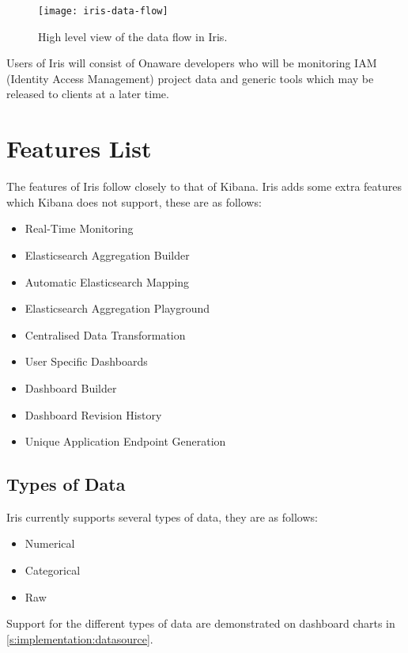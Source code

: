 \documentclass[12pt,a4paper,titlepage]{report}
\begin{document}
\begin{figure}[H]
\begin{tcolorbox}
\begin{center}
\texttt{[image: iris-data-flow]}
\end{center}
\end{tcolorbox}
\caption{High level view of the data flow in Iris.}
\end{figure}

Users of Iris will consist of Onaware developers who will be monitoring IAM (Identity Access Management) project data and generic tools which may be released to clients at a later time.

\section{Features List}
The features of Iris follow closely to that of Kibana. Iris adds some extra features which Kibana does not support, these are as follows:
\begin{itemize}
    \item Real-Time Monitoring
    \item Elasticsearch Aggregation Builder
    \item Automatic Elasticsearch Mapping
    \item Elasticsearch Aggregation Playground
    \item Centralised Data Transformation
    \item User Specific Dashboards
    \item Dashboard Builder
    \item Dashboard Revision History
    \item Unique Application Endpoint Generation
\end{itemize}
\subsection{Types of Data}
Iris currently supports several types of data, they are as follows:
\begin{itemize}
    \item Numerical
    \item Categorical
    \item Raw
\end{itemize}

Support for the different types of data are demonstrated on dashboard charts in \cref{s:implementation:datasource}.
\end{document}
